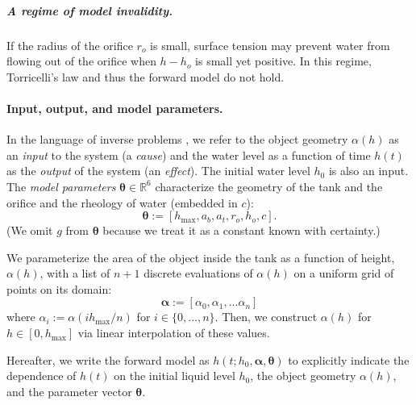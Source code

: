 \documentclass[openacc]{rsproca_new}%
\newcommand\themodel {$h(t; h_0, \boldsymbol \alpha, \boldsymbol\theta)$\xspace}
\begin{document}
\vspace{-\baselineskip}
\subparagraph{A regime of model invalidity.} If the radius of the orifice $r_o$ is small, surface tension may prevent water from flowing out of the orifice when $h- h_o$ is small yet positive. In this regime, Torricelli's law and thus the forward model do not hold.

\paragraph{Input, output, and model parameters.} 
In the language of inverse problems \cite{groetsch1999inverse,waqar2023tutorial}, we refer to the object geometry $\alpha(h)$ as an \emph{input} to the system (a \emph{cause}) and the water level as a function of time $h(t)$ as the \emph{output} of the system (an \emph{effect}).
The initial water level $h_0$ is also an input.  
The \emph{model parameters} $\boldsymbol \theta \in \mathbb{R}^6$ characterize the geometry of the tank and the orifice and the rheology of water (embedded in $c$):
\begin{equation}
	\boldsymbol \theta := [h_{\text{max}}, a_b, a_t, r_o, h_o, c]. \label{eq:theta}
\end{equation}
(We omit $g$ from $\boldsymbol \theta$ because we treat it as a constant known with certainty.)

We parameterize the area of the object inside the tank as a function of height, $\alpha(h)$, with a list of $n+1$ discrete evaluations of $\alpha(h)$ on a uniform grid of points on its domain:
\begin{equation}
	\boldsymbol \alpha := [\alpha_0, \alpha_1, ... \alpha_n] \label{eq:alpha}
\end{equation}
where $\alpha_i :=\alpha(i h_{\text{max}}/n)$ for $i \in \{0, ..., n\}$. Then, we construct $\alpha(h)$ for $h\in [0, h_{\text{max}}]$ via linear interpolation of these values.

Hereafter, we write the forward model as \themodel to explicitly indicate the dependence of $h(t)$ on the initial liquid level $h_0$, the object geometry $\alpha(h)$, and the parameter vector $\boldsymbol \theta$. 
\end{document}
